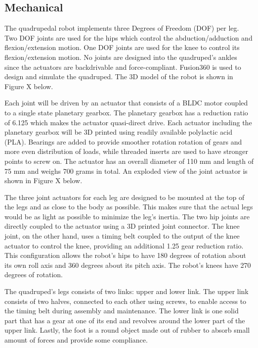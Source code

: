 \documentclass[english]{upeeei}
\begin{document}
\subsection{Mechanical}

The quadrupedal robot implements three Degrees of Freedom (DOF) per leg. Two DOF joints are used for the hips which control the abduction/adduction and flexion/extension motion. One DOF joints are used for the knee to control its flexion/extension motion. No joints are designed into the quadruped's ankles since the actuators are backdrivable and force-compliant.  Fusion360 is used to design and simulate the quadruped. The 3D model of the robot is shown in Figure X below.

Each joint will be driven by an actuator that consists of a BLDC motor coupled to a single state planetary gearbox. The planetary gearbox has a reduction ratio of 6.125 which makes the actuator quasi-direct drive. Each actuator including the planetary gearbox will be 3D printed using readily available polylactic acid (PLA). Bearings are added to provide smoother rotation rotation of gears and more even distribution of loads, while threaded inserts are used to have stronger points to screw on. The actuator has an overall diameter of 110 mm and length of 75 mm and weighs 700 grams in total. An exploded view of the joint actuator is shown in Figure X below.

The three joint actuators for each leg are designed to be mounted at the top of the legs and as close to the body as possible. This makes sure that the actual legs would be as light as possible to minimize the leg's inertia. The two hip joints are directly coupled to the actuator using a 3D printed joint connector. The knee joint, on the other hand, uses a timing belt coupled to the output of the knee actuator to control the knee, providing an additional 1.25 gear reduction ratio. This configuration allows the robot's hips to have 180 degrees of rotation about its own roll axis and 360 degrees about its pitch axis. The robot's knees have 270 degrees of rotation. 

The quadruped's legs consists of two links: upper and lower link. The upper link consists of two halves, connected to each other using screws, to enable access to the timing belt during assembly and maintenance. The lower link is one solid part that has a gear at one of its end and revolves around the lower part of the upper link. Lastly, the foot is a round object made out of rubber to absorb small amount of forces and provide some compliance.
\end{document}
